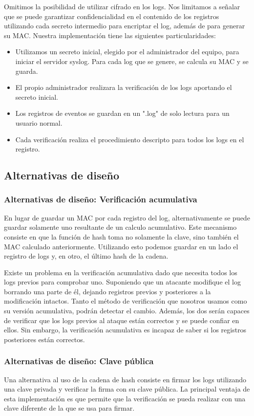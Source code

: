 Omitimos la posibilidad de utilizar cifrado en los logs. Nos limitamos a señalar que se puede garantizar confidencialidad en el contenido de los registros utilizando cada secreto intermedio para encriptar el log, además de para generar su MAC.
Nuestra implementación tiene las siguientes particularidades:
\begin{itemize}
\item Utilizamos un secreto inicial, elegido por el administrador del equipo, para iniciar el servidor syslog.
Para cada log que se genere, se calcula su MAC y se guarda.
\item El propio administrador realizara la verificación de los logs aportando el secreto inicial.
\item Los registros de eventos se guardan en un ".log" de solo lectura para un usuario normal.
\item Cada verificación realiza el procedimiento descripto para todos los logs en el registro.
\end{itemize}
\subsection{Alternativas de diseño}
\subsubsection{Alternativas de diseño: Verificación acumulativa}
En lugar de guardar un MAC por cada registro del log, alternativamente se puede guardar solamente uno resultante de un calculo acumulativo. Este mecanismo consiste en que la función de hash toma no solamente la clave, sino también el MAC calculado anteriormente. 
Utilizando esto podemos guardar en un lado el registro de logs y, en otro, el último hash de la cadena. 

Existe un problema en la verificación acumulativa dado que necesita todos los logs previos para comprobar uno. Suponiendo que un atacante modifique el log borrando una parte de él, dejando registros previos y posteriores a la modificación intactos. Tanto el método de verificación que nosotros usamos como su versión acumulativa, podrán detectar el cambio. Además, los dos serán capaces de verificar que los logs previos al ataque están correctos y se puede confiar en ellos. Sin embargo, la verificación acumulativa es incapaz de saber si los registros posteriores están correctos.   
\subsubsection{Alternativas de diseño: Clave pública}
Una alternativa al uso de la cadena de hash consiste en firmar los logs utilizando una clave privada y verificar la firma con su clave pública. La principal ventaja de esta implementación es que permite que la verificación se pueda realizar con una clave diferente de la que se usa para firmar. 

